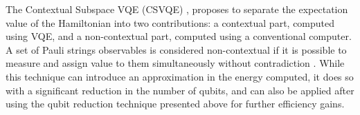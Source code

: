 The Contextual Subspace VQE (CSVQE) \cite{Kirby2021_CSVQE}, proposes to separate the expectation value of the Hamiltonian into two contributions: a contextual part, computed using VQE, and a non-contextual part, computed using a conventional computer. A set of Pauli strings observables is considered non-contextual if it is possible to measure and assign value to them simultaneously without contradiction \cite{Kirby2021_CSVQE, Raussendorf2013, Howard2014, Cabello2014, Cabello2015, Ramanathan2014, Kirby2019, Kirby2020_classical_sim}. While this technique can introduce an approximation in the energy computed, it does so with a significant reduction in the number of qubits, and can also be applied after using the qubit reduction technique presented above for further efficiency gains\cite{Kirby2021_CSVQE}. 

